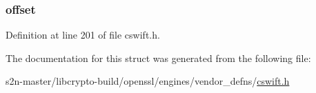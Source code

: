 \subsubsection[{\texorpdfstring{offset}{offset}}]{ offset}\hypertarget{struct___s_w___n_v_d_a_t_a_abf1566436ece7fb650846bb642a3b1b4}{}\label{struct___s_w___n_v_d_a_t_a_abf1566436ece7fb650846bb642a3b1b4}


Definition at line 201 of file cswift.\+h.



The documentation for this struct was generated from the following file\+:\begin{DoxyCompactItemize}
\item 
s2n-\/master/libcrypto-\/build/openssl/engines/vendor\+\_\+defns/\hyperlink{cswift_8h}{cswift.\+h}\end{DoxyCompactItemize}

